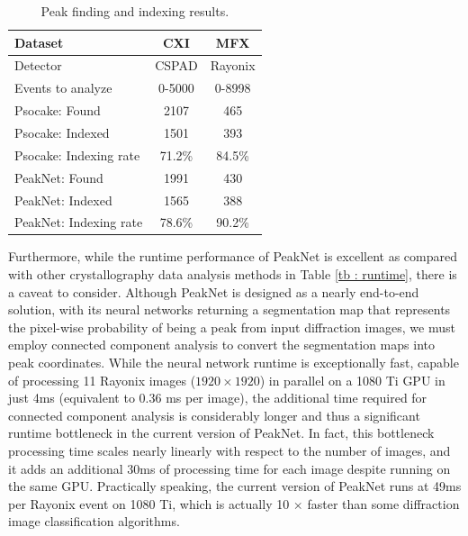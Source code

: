 \documentclass[conference]{IEEEtran}
\newcommand{\peaknet}{PeakNet}
\newcommand{\psocake}{Psocake}
\begin{document}
\begin{table}[htbp]
\caption{
    Peak finding and indexing results.
}
\label{tb : perf}
\centering
\begin{tabular}{ | l || c | c | }
    \hline
    Dataset           &  CXI   & MFX\\
    \hline
    Detector          & CSPAD  & Rayonix \\
    Events to analyze & 0-5000 & 0-8998 \\
    \hline
    \psocake{}: Found         &  2107   & 465  \\
    \psocake{}: Indexed       &  1501   & 393  \\
    \psocake{}: Indexing rate &  71.2\% & 84.5\% \\
    \hline
    \peaknet{}: Found         &  1991   & 430  \\
    \peaknet{}: Indexed       &  1565   & 388  \\
    \peaknet{}: Indexing rate &  78.6\% & 90.2\% \\
    \hline
\end{tabular}
\end{table}

Furthermore, while the runtime performance of \peaknet{} is excellent as
compared with other crystallography data analysis methods in Table \ref{tb :
runtime}, there is a caveat to consider.  Although \peaknet{} is designed as a
nearly end-to-end solution, with its neural networks returning a segmentation map
that represents the pixel-wise probability of being a peak from input
diffraction images, we must employ connected component analysis to convert the
segmentation maps into peak coordinates.  While the neural network runtime is
exceptionally fast, capable of processing 11 Rayonix images ($1920 \times 1920$)
in parallel on a 1080 Ti GPU in just 4ms (equivalent to 0.36 ms per image), the
additional time required for connected component analysis is considerably longer
and thus a significant runtime bottleneck in the current version of \peaknet{}.
In fact, this bottleneck processing time scales nearly linearly with respect to
the number of images, and it adds an additional 30ms of processing time for each
image despite running on the same GPU.  Practically speaking, the current
version of \peaknet{} runs at 49ms per Rayonix event on 1080 Ti, which is
actually 10 $\times$ faster than some diffraction image classification
algorithms.
\end{document}
